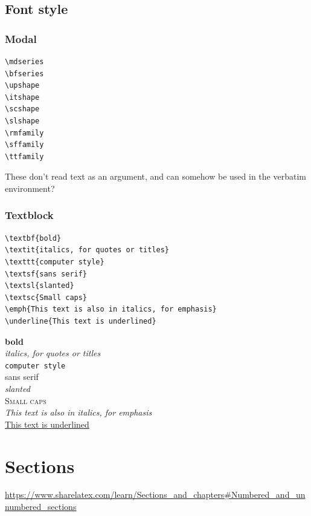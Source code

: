 \documentclass{article}
\begin{document}
\subsection{Font style}
\subsubsection{Modal}
\begin{minipage}[t]{0.5\textwidth}
\begin{verbatim}
\mdseries
\bfseries
\upshape
\itshape
\scshape
\slshape
\rmfamily
\sffamily
\ttfamily
\end{verbatim}
\end{minipage}
\begin{minipage}[t]{0.5\textwidth}
    These don't read text as an argument, and can somehow be
    used in the verbatim environment?
\end{minipage}

\subsubsection{Textblock}
\begin{minipage}[t]{0.5\textwidth}
\begin{verbatim}
\textbf{bold}
\textit{italics, for quotes or titles}
\texttt{computer style}
\textsf{sans serif}
\textsl{slanted}
\textsc{Small caps}
\emph{This text is also in italics, for emphasis}
\underline{This text is underlined}
\end{verbatim}
\end{minipage}
\begin{minipage}[t]{0.5\textwidth}
\textbf{bold}\\
\textit{italics, for quotes or titles}\\
\texttt{computer style}\\
\textsf{sans serif}\\
\textsl{slanted}\\
\textsc{Small caps}\\
\emph{This text is also in italics, for emphasis}\\
\underline{This text is underlined}
\end{minipage}


\section{Sections}
\url{https://www.sharelatex.com/learn/Sections_and_chapters#Numbered_and_unnumbered_sections}
\end{document}
